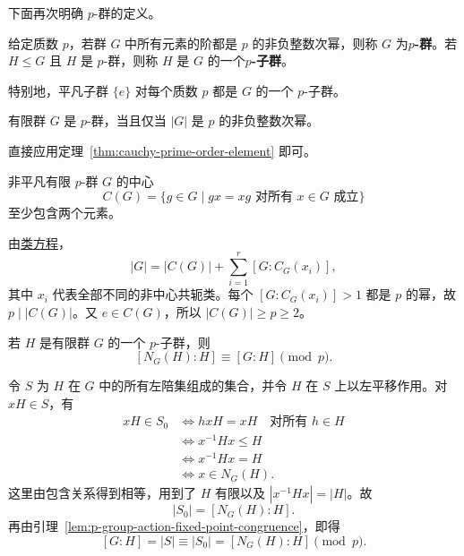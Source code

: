 \begin{purplenote}
下面再次明确 $p$-群的定义。
\end{purplenote}

\begin{definition}[$p$-群]\label{def:p-group-p-subgroup}
给定质数 $p$，若群 $G$ 中所有元素的阶都是 $p$ 的非负整数次幂，则称 $G$ 为\textbf{$p$-群}。若 $H\leq G$ 且 $H$ 是 $p$-群，则称 $H$ 是 $G$ 的一个\textbf{$p$-子群}。

特别地，平凡子群 $\{e\}$ 对每个质数 $p$ 都是 $G$ 的一个 $p$-子群。
\end{definition}

\begin{corollary}\label{cor:finite-p-group-order-characterization}
有限群 $G$ 是 $p$-群，当且仅当 $|G|$ 是 $p$ 的非负整数次幂。
\end{corollary}

\begin{purpleproof}
直接应用定理~\ref{thm:cauchy-prime-order-element} 即可。
\end{purpleproof}

\begin{corollary}\label{cor:nontrivial-finite-p-group-center}
非平凡有限 $p$-群 $G$ 的中心
\[
  C(G)=\{g\in G\mid gx=xg\text{ 对所有 }x\in G\text{ 成立}\}
\]
至少包含两个元素。
\end{corollary}

\begin{purpleproof}
由\hyperref[cor:conjugacy-class-equation]{类方程}，
\[
  |G|=|C(G)|+\sum_{i=1}^{r}[G:C_G(x_i)],
\]
其中 $x_i$ 代表全部不同的非中心共轭类。每个 $[G:C_G(x_i)]>1$ 都是 $p$ 的幂，故 $p\mid |C(G)|$。又 $e\in C(G)$，所以 $|C(G)|\geq p\geq2$。
\end{purpleproof}

\begin{lemma}\label{lem:p-subgroup-normalizer-index-congruence}
若 $H$ 是有限群 $G$ 的一个 $p$-子群，则
\[
  [N_G(H):H]\equiv [G:H]\pmod p.
\]
\end{lemma}

\begin{purpleproof}
令 $S$ 为 $H$ 在 $G$ 中的所有左陪集组成的集合，并令 $H$ 在 $S$ 上以左平移作用。对 $xH\in S$，有
\[
  \begin{aligned}
    xH\in S_0
      &\Longleftrightarrow hxH=xH\quad\text{对所有 }h\in H\\
      &\Longleftrightarrow x^{-1}Hx\leq H\\
      &\Longleftrightarrow x^{-1}Hx=H\\
      &\Longleftrightarrow x\in N_G(H).
  \end{aligned}
\]
这里由包含关系得到相等，用到了 $H$ 有限以及 $|x^{-1}Hx|=|H|$。故
\[
  |S_0|=[N_G(H):H].
\]
再由引理~\ref{lem:p-group-action-fixed-point-congruence}，即得
\[
  [G:H]=|S|\equiv |S_0|=[N_G(H):H]\pmod p.
\]
\end{purpleproof}


